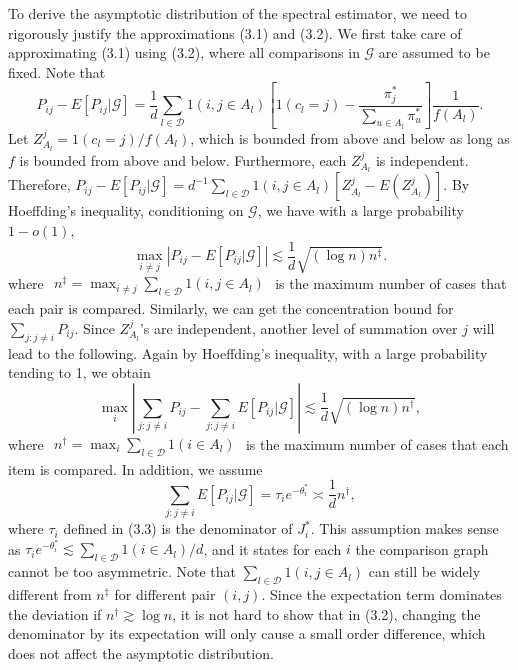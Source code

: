 To derive the asymptotic distribution of the spectral estimator, we need to rigorously justify the approximations (3.1) and (3.2). We first take care of approximating (3.1) using (3.2), where all comparisons in \(\mathcal{G}\) are assumed to be fixed. Note that
\[
P_{ij} - E[P_{ij}|\mathcal{G}] = \frac{1}{d}\sum_{l\in \mathcal{D}}1(i,j\in A_l)\left[1(c_l = j) - \frac{\pi_j^*}{\sum_{u\in A_l}\pi_u^*}\right]\frac{1}{f(A_l)}.
\]
Let \(Z_{A_l}^j = 1(c_l = j) / f(A_l)\), which is bounded from above and below as long as \(f\) is bounded from above and below. Furthermore, each \(Z_{A_l}^j\) is independent. Therefore, \(P_{ij} - E[P_{ij}|\mathcal{G}] = d^{- 1}\sum_{l\in \mathcal{D}}1(i,j\in A_l)[Z_{A_l}^j - E(Z_{A_l}^j)]\). By Hoeffding's inequality, conditioning on \(\mathcal{G}\), we have with a large probability \(1 - o(1)\),
\[
\max_{i\neq j}\left|P_{ij} - E[P_{ij}|\mathcal{G}]\right|\lesssim \frac{1}{d}\sqrt{(\log n)n^{\ddagger}}.
\]
where \(\begin{array}{r}{n^{\ddagger} = \max_{i\neq j}\sum_{l\in \mathcal{D}}1(i,j\in A_{l})} \end{array}\) is the maximum number of cases that each pair is compared. Similarly, we can get the concentration bound for \(\sum_{j:j\neq i}P_{ij}\). Since \(Z_{A_{l}}^{j}\)'s are independent, another level of summation over \(j\) will lead to the following. Again by Hoeffding's inequality, with a large probability tending to 1, we obtain
\[
\max_{i}\left|\sum_{j:j\neq i}P_{ij} - \sum_{j:j\neq i}E[P_{ij}|\mathcal{G}]\right|\lesssim \frac{1}{d}\sqrt{(\log n)n^{\dagger}},
\]
where \(\begin{array}{r}{n^{\dagger} = \max_{i}\sum_{l\in \mathcal{D}}1(i\in A_{l})} \end{array}\) is the maximum number of cases that each item is compared. In addition, we assume
\[
\sum_{j:j\neq i}E[P_{ij}|\mathcal{G}] = \tau_{i}e^{-\theta_{i}^{*}}\asymp \frac{1}{d} n^{\dagger},
\]
where \(\tau_{i}\) defined in (3.3) is the denominator of \(J_{i}^{*}\). This assumption makes sense as \(\tau_{i}e^{- \theta_{i}^{*}}\lesssim \sum_{l\in \mathcal{D}}1(i\in A_{l}) / d\), and it states for each \(i\) the comparison graph cannot be too asymmetric. Note that \(\sum_{l\in \mathcal{D}}1(i,j\in A_{l})\) can still be widely different from \(n^{\ddagger}\) for different pair \((i,j)\). Since the expectation term dominates the deviation if \(n^{\dagger}\gtrsim \log n\), it is not hard to show that in (3.2), changing the denominator by its expectation will only cause a small order difference, which does not affect the asymptotic distribution.

